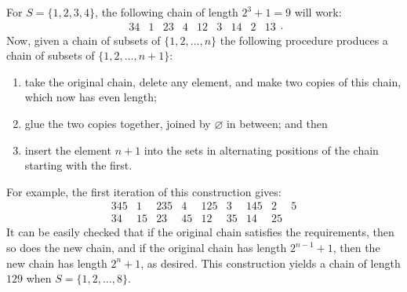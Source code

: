 \documentclass[11pt]{scrartcl}
\begin{document}
For $S = \{1, 2, 3, 4\}$,
the following chain of length $2^3 + 1 = 9$ will work:
\[
\begin{array}{ccccccccc}
  34 & 1 & 23 & 4 & 12 & 3 & 14 & 2 & 13
\end{array}.
\]
Now, given a chain of subsets of $\{1, 2, \dots, n\}$
the following procedure produces a
chain of subsets of $\{1, 2, \dots, n+1\}$:
\begin{enumerate}
\item take the original chain, delete any element,
  and make two copies of this chain, which now has even length;
\item glue the two copies together,
  joined by $\varnothing$ in between; and then
\item insert the element $n+1$ into the sets in alternating positions
  of the chain starting with the first.
\end{enumerate}
For example, the first iteration of this construction gives:
\[
 \begin{array}{ccccccccc}
 345 & 1 & 235 & 4 & 125 & 3 & 145 & 2 & 5 \\
 34 & 15 & 23 & 45 & 12 & 35 & 14 & 25 &
 \end{array}
\]
It can be easily checked that if the original chain satisfies the requirements,
then so does the new chain, and if the original chain has length $2^{n-1}+1$,
then the new chain has length $2^{n}+1$, as desired.
This construction yields a chain of length $129$
when $S = \{1, 2, \dots, 8\}$.
\end{document}
